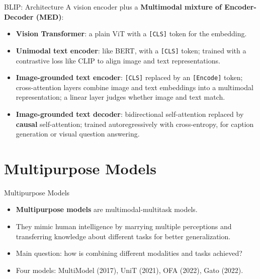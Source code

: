 \begin{frame}{BLIP: Architecture}
A vision encoder plus a \textbf{Multimodal mixture of Encoder-Decoder (MED)}:
\begin{itemize}
  \item \textbf{Vision Transformer}: a plain ViT with a {\tt [CLS]} token for the embedding.
  \item \textbf{Unimodal text encoder}: like BERT, with a {\tt [CLS]} token; trained with a contrastive loss like CLIP to align image and text representations.
  \item \textbf{Image-grounded text encoder}: {\tt [CLS]} replaced by an {\tt [Encode]} token; cross-attention layers combine image and text embeddings into a multimodal representation; a linear layer judges whether image and text match.
  \item \textbf{Image-grounded text decoder}: bidirectional self-attention replaced by \textbf{causal} self-attention; trained autoregressively with cross-entropy, for caption generation or visual question answering.
\end{itemize}
\end{frame}

\section{Multipurpose Models}

\begin{frame}{Multipurpose Models}
\begin{itemize}
  \item \textbf{Multipurpose models} are multimodal-multitask models.
  \item They mimic human intelligence by marrying multiple perceptions and transferring knowledge about different tasks for better generalization.
  \item Main question: how is combining different modalities and tasks achieved?
  \item Four models: MultiModel (2017), UniT (2021), OFA (2022), Gato (2022).
\end{itemize}
\end{frame}

